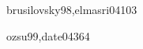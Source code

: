 \begin{syllabus}
\begin{unit}{\IMInformationStorageAndRetrievalDef}{}{brusilovsky98,elmasri04}{10}{3}
    \IMInformationStorageAndRetrievalAllTopics%
    \IMInformationStorageAndRetrievalAllObjectives%
\end{unit}

\begin{unit}{\IMDistributedDatabasesDef}{}{ozsu99,date04}{36}{4}
    \IMDistributedDatabasesAllTopics
    \IMDistributedDatabasesAllObjectives
\end{unit}

\begin{coursebibliography}
\end{coursebibliography}

\end{syllabus}

%
